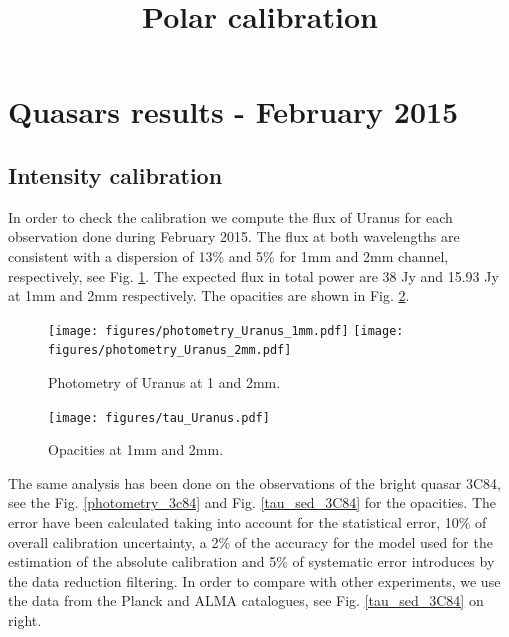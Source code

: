 \documentclass[a4paper,10pt]{article}
\title{Polar calibration}
\begin{document}
\section{Quasars results - February 2015}
\subsection{Intensity calibration}
In order to check the calibration we compute the flux of Uranus for each observation done during February 2015. The flux at both wavelengths are consistent with a dispersion of 13$\%$ and 5$\%$ for 1mm and 2mm channel, respectively, see Fig. \ref{photometry}. The expected flux in total power are 38 Jy and 15.93 Jy at 1mm and 2mm respectively. The opacities are shown in Fig. \ref{opacities}.

\begin{figure}[h!]
	 \texttt{[image: figures/photometry\_Uranus\_1mm.pdf]}
	 \texttt{[image: figures/photometry\_Uranus\_2mm.pdf]}
		\caption{\footnotesize Photometry of Uranus at 1 and 2mm.}
	\label{photometry}
\end{figure}

\begin{figure}[h!]
	\begin{center}
	 \texttt{[image: figures/tau\_Uranus.pdf]}
				\caption{\footnotesize Opacities at 1mm and 2mm.}
	\label{opacities}
	\end{center}
\end{figure}

The same analysis has been done on the observations of the bright quasar 3C84, see the Fig. \ref{photometry_3c84} and Fig. \ref{tau_sed_3C84} for the opacities. The error have been calculated taking into account for the statistical error, 10$\%$ of overall calibration uncertainty, a 2$\%$ of the accuracy for the model used for the estimation of the absolute calibration and 5$\%$ of systematic error introduces by the data reduction filtering. In order to compare with other experiments, we use the data from the Planck and ALMA catalogues, see Fig. \ref{tau_sed_3C84} on right.
\end{document}
